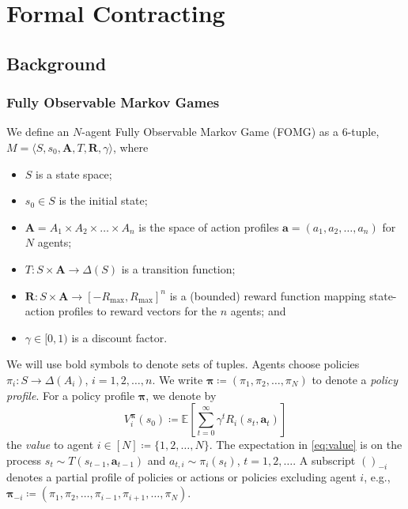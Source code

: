 \documentclass[referee,sn-basic]{sn-jnl}
\newcommand{\E}{\mathbb{E}}
\theoremstyle{thmstyleone}%
\theoremstyle{thmstyletwo}%
\theoremstyle{thmstylethree}%
\begin{document}
\section{Formal Contracting}\label{sec:background}
\subsection{Background}
\subsubsection{Fully Observable Markov Games} We define an $N$-agent Fully Observable Markov Game (FOMG) as a 6-tuple, $M = \langle S,s_0, \mathbf A, T, \mathbf R, \gamma \rangle$, where
\begin{itemize}
\item $S$ is a state space;
\item $s_0 \in S$ is the initial state;
\item $\mathbf A = A_1 \times A_2 \times \dots \times A_n$ is the space of action profiles $\mathbf a = (a_1, a_2, \dots, a_n)$ for $N$ agents;
\item $T \colon S \times \mathbf A \to \Delta(S)$ is a transition function;
\item $\mathbf R \colon S \times \mathbf A \to [-R_{\max}, R_{\max}]^n$ is a (bounded) reward function mapping state-action profiles to reward vectors for the $n$ agents; and
\item $\gamma \in [0,1)$ is a discount factor.
\end{itemize}
We will use bold symbols to denote sets of tuples. Agents choose policies $\pi_i \colon S \to \Delta(A_i)$, $i=1, 2, \dots, n$. We write $\boldsymbol\pi \coloneqq (\pi_1, \pi_2, \dots, \pi_N)$ to denote a \emph{policy profile}. For a policy profile $\boldsymbol\pi$, we denote by 
\begin{equation}
V_i^{\boldsymbol\pi}(s_0) \coloneqq \E\left[\sum_{t=0}^\infty \gamma^t R_i(s_t, \mathbf a_t)\right]\label{eq:value}
\end{equation}
the \emph{value} to agent $i \in [N] \coloneqq \{ 1, 2, \dots, N\}$. The expectation in \eqref{eq:value} is on the process $s_t \sim T(s_{t-1}, \mathbf a_{t-1})$ and $a_{t,i} \sim \pi_i(s_t)$, $t=1, 2, \dots$.  A subscript ${()}_{-i}$ denotes a partial profile of policies or actions or policies excluding agent $i$, e.g., $\boldsymbol\pi_{-i} \coloneqq (\pi_1, \pi_2, \dots, \pi_{i-1}, \pi_{i+1}, \dots, \pi_N)$.
\end{document}
